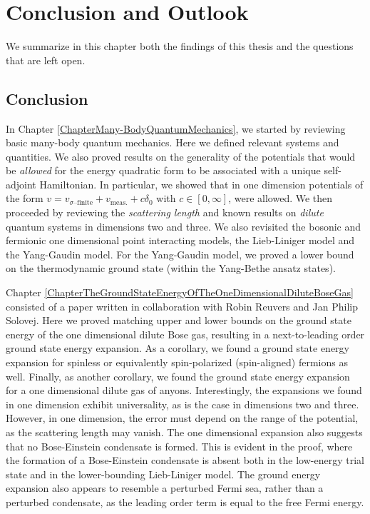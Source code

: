 \chapter{Conclusion and Outlook}
\label{ChapterConclusionAndOutlook}
We summarize in this chapter both the findings of this thesis and the questions that are left open.
\section{Conclusion}
In Chapter \ref{ChapterMany-BodyQuantumMechanics}, we started by reviewing basic many-body quantum mechanics. Here we defined relevant systems and quantities. We also proved results on the generality of the potentials that would be \emph{allowed} for the energy quadratic form to be associated with a unique self-adjoint Hamiltonian. In particular, we showed that in one dimension potentials of the form $ v=v_{\sigma\text{--finite}}+v_{\text{meas.}} +c\delta_0 $ with $ c\in[0,\infty] $, were allowed. We then proceeded by reviewing the \emph{scattering length} and known results on \emph{dilute} quantum systems in dimensions two and three. We also revisited the bosonic and fermionic one dimensional point interacting models, \ie the Lieb-Liniger model and the Yang-Gaudin model.
For the Yang-Gaudin model, we proved a lower bound on the thermodynamic ground state (within the Yang-Bethe ansatz states).

Chapter \ref{ChapterTheGroundStateEnergyOfTheOneDimensionalDiluteBoseGas} consisted of a paper written in collaboration with Robin Reuvers and Jan Philip Solovej. Here we proved matching upper and lower bounds on the ground state energy of the one dimensional dilute Bose gas, resulting in a next-to-leading order ground state energy expansion. As a corollary, we found a ground state energy expansion for spinless or equivalently spin-polarized (spin-aligned) fermions as well. Finally, as another corollary, we found the ground state energy expansion for a one dimensional dilute gas of anyons. Interestingly, the expansions we found in one dimension exhibit universality, as is the case in dimensions two and three. However, in one dimension, the error must depend on the range of the potential, as the scattering length may vanish. The one dimensional expansion also suggests that no Bose-Einstein condensate is formed. This is evident in the proof, where the formation of a Bose-Einstein condensate is absent both in the low-energy trial state and in the lower-bounding Lieb-Liniger model. The ground energy expansion also appears to resemble a perturbed Fermi sea, rather than a perturbed condensate, as the leading order term is equal to the free Fermi energy.

